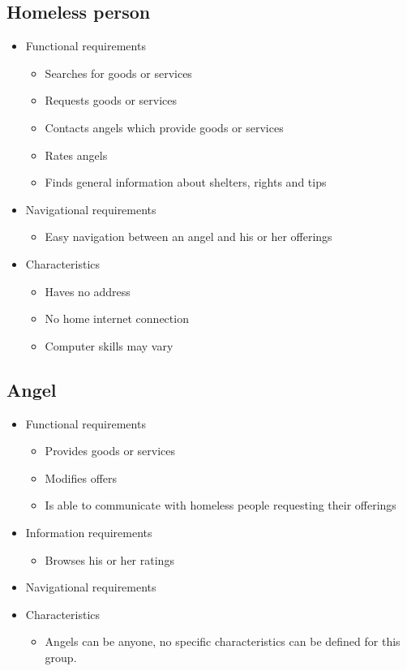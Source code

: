 \documentclass[a4paper]{report}
\begin{document}
\subsection{Homeless person}
\begin{itemize}
	\item Functional requirements
	\begin{itemize}
		\item Searches for goods or services
		\item Requests goods or services
		\item Contacts angels which provide goods or services
		\item Rates angels
		\item Finds general information about shelters, rights and tips
	\end{itemize}
	\item Navigational requirements
	\begin{itemize}
		\item Easy navigation between an angel and his or her offerings
	\end{itemize}
	\item Characteristics
	\begin{itemize}
		\item Haves no address
		\item No home internet connection
		\item Computer skills may vary
	\end{itemize}
\end{itemize}

\subsection{Angel}
\begin{itemize}
	\item Functional requirements
	\begin{itemize}
		\item Provides goods or services
		\item Modifies offers
		\item Is able to communicate with homeless people requesting their offerings
	\end{itemize}
	\item Information requirements
	\begin{itemize}
		\item Browses his or her ratings
	\end{itemize}
	\item Navigational requirements
	\item Characteristics
	\begin{itemize}
		\item Angels can be anyone, no specific characteristics can be defined for this group.
	\end{itemize}
\end{itemize}
\end{document}

